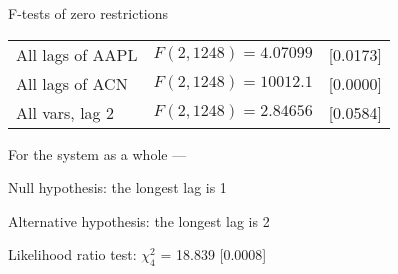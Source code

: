 \documentclass[11pt]{article}
\begin{document}
\begin{center}
F-tests of zero restrictions\\[1em]
\begin{tabular}{lll}
All lags of AAPL & $F(2, 1248) = 4.07099$ & [0.0173]\\
All lags of ACN & $F(2, 1248) = 10012.1$ & [0.0000]\\
All vars, lag 2 & $F(2, 1248) = 2.84656$ & [0.0584]\\
\end{tabular}
\end{center}

\clearpage


\noindent For the system as a whole ---\par
Null hypothesis: the longest lag is 1\par
Alternative hypothesis: the longest lag is 2\par
Likelihood ratio test: $\chi^2_{4}$ = 18.839 [0.0008]\par
\end{document}
